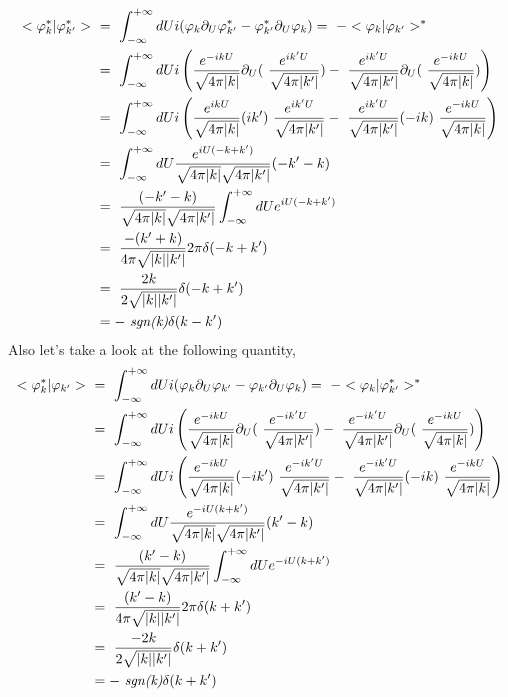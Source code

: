 
\begin{eqnarray*}\label{eq:orthoss}
    <\varphi^*_k|\varphi^*_{k'}>~&=~\int^{+\infty}_{-\infty}dU i(\varphi_k\partial_U\varphi^*_{k'}-\varphi^*_{k'}\partial_U\varphi_k)=~-<\varphi_k|\varphi_{k'}>^*\\
    &=~\int^{+\infty}_{-\infty}dU i\left(\frac{e^{-i k U}}{\sqrt{4\pi|k|}}\partial_U(~\frac{e^{i k' U}}{\sqrt{4\pi|k'|}})-~\frac{e^{i k' U}}{\sqrt{4\pi|k'|}}\partial_U(~\frac{e^{-i k U}}{\sqrt{4\pi|k|}})\right)\\
    &=~\int^{+\infty}_{-\infty}dU i\left(\frac{e^{i k U}}{\sqrt{4\pi|k|}}(ik')~\frac{e^{i k' U}}{\sqrt{4\pi|k'|}}-~\frac{e^{i k' U}}{\sqrt{4\pi|k'|}}(-ik)~\frac{e^{-i k U}}{\sqrt{4\pi|k|}}\right)\\
    &=~\int^{+\infty}_{-\infty}dU\frac{e^{iU(-k+k')}}{\sqrt{4\pi|k|}\sqrt{4\pi|k'|}}(-k'-k)\\
    &=~\frac{(-k'-k)}{\sqrt{4\pi|k|}\sqrt{4\pi|k'|}}\int^{+\infty}_{-\infty}dU e^{iU(-k+k')}\\
    &=~\frac{-(k'+k)}{4\pi\sqrt{|k||k'|}}2\pi\delta(-k+k')\\
    &=~\frac{2k}{2\sqrt{|k||k'|}}\delta(-k+k')\\
    &=-~\emph{sgn(k)}\delta(k-k')
\end{eqnarray*}
Also let's take a look at the following quantity,
\begin{eqnarray*}\label{eq:orthoss}
    <\varphi^*_k|\varphi_{k'}>~&=~\int^{+\infty}_{-\infty}dU i(\varphi_k\partial_U\varphi_{k'}-\varphi_{k'}\partial_U\varphi_k)=~-<\varphi_k|\varphi^*_{k'}>^*\\
    &=~\int^{+\infty}_{-\infty}dU i\left(\frac{e^{-i k U}}{\sqrt{4\pi|k|}}\partial_U(~\frac{e^{-i k' U}}{\sqrt{4\pi|k'|}})-~\frac{e^{-i k' U}}{\sqrt{4\pi|k'|}}\partial_U(~\frac{e^{-i k U}}{\sqrt{4\pi|k|}})\right)\\
    &=~\int^{+\infty}_{-\infty}dU i\left(\frac{e^{-i k U}}{\sqrt{4\pi|k|}}(-ik')~\frac{e^{-i k' U}}{\sqrt{4\pi|k'|}}-~\frac{e^{-i k' U}}{\sqrt{4\pi|k'|}}(-ik)~\frac{e^{-i k U}}{\sqrt{4\pi|k|}}\right)\\
    &=~\int^{+\infty}_{-\infty}dU\frac{e^{-iU(k+k')}}{\sqrt{4\pi|k|}\sqrt{4\pi|k'|}}(k'-k)\\
    &=~\frac{(k'-k)}{\sqrt{4\pi|k|}\sqrt{4\pi|k'|}}\int^{+\infty}_{-\infty}dU e^{-iU(k+k')}\\
    &=~\frac{(k'-k)}{4\pi\sqrt{|k||k'|}}2\pi\delta(k+k')\\
    &=~\frac{-2k}{2\sqrt{|k||k'|}}\delta(k+k')\\
    &=-~\emph{sgn(k)}\delta(k+k')
\end{eqnarray*}
